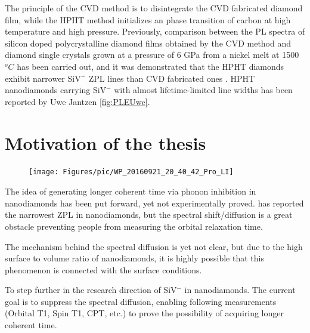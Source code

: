 The principle of the CVD method is to disintegrate the CVD fabricated diamond film, while the HPHT method initializes an phase transition of carbon at high temperature and high pressure. Previously, comparison between the PL spectra of silicon doped polycrystalline diamond films obtained by the CVD method and diamond single crystals grown at a pressure of 6 GPa from a nickel melt at 1500$^{o}C$ has been carried out, and it was demonstrated that the HPHT diamonds exhibit narrower SiV$^{-}$ ZPL lines than CVD fabricated ones \citep{clark_silicon_1995}. HPHT nanodiamonds carrying SiV$^{-}$ with almost lifetime-limited line widths has been reported by Uwe Jantzen \ref{fig:PLEUwe}. \citep{jantzen_nanodiamonds_2016}


\section[Motivation of the thesis]{Motivation of the thesis}
\FloatBarrier
\begin{figure}[h]
	\centering
	\texttt{[image: Figures/pic/WP\_20160921\_20\_40\_42\_Pro\_LI]}
	\caption{}
	\label{fig:wp20160921204042proli}
\end{figure}
\FloatBarrier

The idea of generating longer coherent time via phonon inhibition in nanodiamonds has been put forward, yet not experimentally proved.
\citep{jantzen_nanodiamonds_2016} has reported the narrowest ZPL in nanodiamonds, but the spectral shift/diffusion is a great obstacle preventing people from measuring the orbital relaxation time. 

The mechanism behind the spectral diffusion is yet not clear, but due to the high surface to volume ratio of nanodiamonds, it is highly possible that this phenomenon is connected with the surface conditions. \citep{jantzen_nanodiamonds_2016}

To step further in the research direction of SiV$^{-}$ in nanodiamonds. The current goal is to suppress the spectral diffusion, enabling following measurements (Orbital T1, Spin T1, CPT, etc.) to prove the possibility of acquiring longer coherent time.
